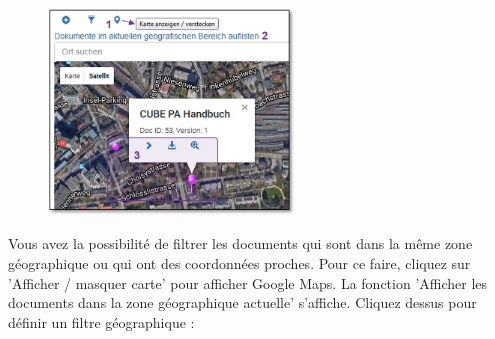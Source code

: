 \begin{figure}
  \vspace{-35pt}
  \begin{center}
    \includegraphics[height=55mm]{../chapters/11_Dokumentenablage/pictures/11-2-3_GeoBereichFilter.jpg}
  \end{center}
  \vspace{-20pt}
  \vspace{-10pt}
\end{figure}
Vous avez la possibilité de filtrer les documents qui sont dans la même zone géographique ou qui ont des coordonnées proches. Pour ce faire, cliquez sur 'Afficher / masquer carte'  pour afficher Google Maps. La fonction 'Afficher les documents dans la zone géographique actuelle'  s'affiche. Cliquez dessus pour définir un filtre géographique :

\vspace{1.5cm} 

